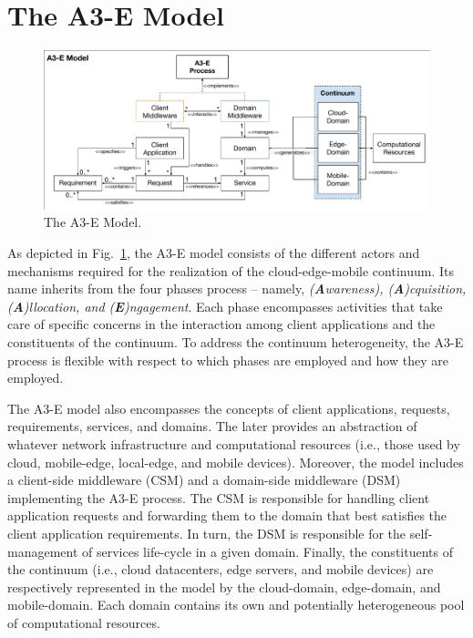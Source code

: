 \section{The A3-E Model}\label{sec:proposal}

\begin{figure}[tbp]
	\includegraphics[width=1\textwidth]{figs/A3-E-model.pdf}
	\caption{The A3-E Model.}
	\label{fig:A3-E-model}
\end{figure}

As depicted in Fig.~\ref{fig:A3-E-model}, the A3-E model consists of the different actors and mechanisms required for the realization of the cloud-edge-mobile continuum. Its name inherits from the four phases process -- namely, \textit{(\textbf{A}wareness), (\textbf{A})cquisition, (\textbf{A})llocation, and (\textbf{E})ngagement}. Each phase encompasses activities that take care of specific concerns in the interaction among client applications and the constituents of the continuum. To address the continuum heterogeneity, the A3-E process is flexible with respect to which phases are employed and how they are employed.

The A3-E model also encompasses the concepts of client applications, requests, requirements, services, and domains. The later provides an abstraction of whatever network infrastructure and computational resources (i.e., those used by cloud, mobile-edge, local-edge, and mobile devices). Moreover, the model includes a client-side middleware (CSM) and a domain-side middleware (DSM) implementing the A3-E process. The CSM is responsible for handling client application requests and forwarding them to the domain that best satisfies the client application requirements. In turn, the DSM is responsible for the self-management of services life-cycle in a given domain. Finally, the constituents of the continuum (i.e., cloud datacenters, edge servers, and mobile devices) are respectively represented in the model by the cloud-domain, edge-domain, and mobile-domain. Each domain contains its own and potentially heterogeneous pool of computational resources.

